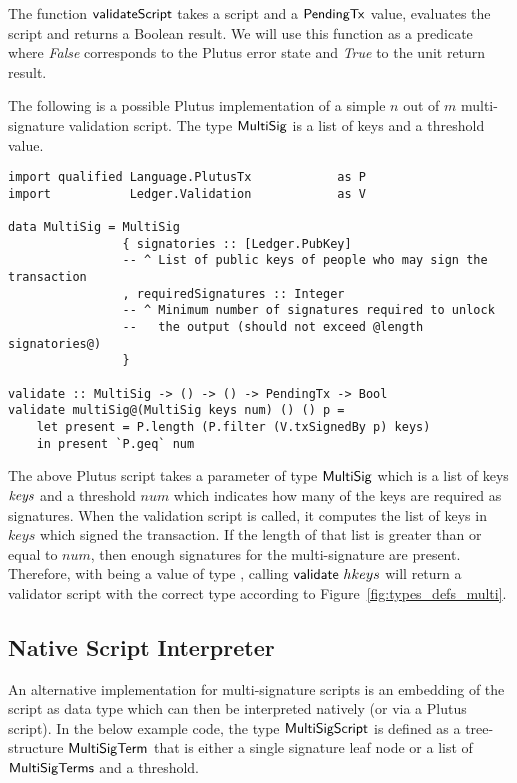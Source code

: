 \documentclass[11pt,a4paper,dvipsnames]{article}
\newcommand{\PendingTx}{\type{PendingTx}}
\theoremstyle{definition}
\begin{document}
The function $\mathsf{validateScript}$ takes a script and a $\PendingTx$ value,
evaluates the script and returns a Boolean result. We will use this function as
a predicate where \emph{False} corresponds to the Plutus error state and
\emph{True} to the unit return result.

The following is a possible Plutus implementation of a simple $n$ out of $m$
multi-signature validation script. The type $\mathsf{MultiSig}$ is a list of keys
and a threshold value.

\begin{verbatim}
import qualified Language.PlutusTx            as P
import           Ledger.Validation            as V

data MultiSig = MultiSig
                { signatories :: [Ledger.PubKey]
                -- ^ List of public keys of people who may sign the transaction
                , requiredSignatures :: Integer
                -- ^ Minimum number of signatures required to unlock
                --   the output (should not exceed @length signatories@)
                }

validate :: MultiSig -> () -> () -> PendingTx -> Bool
validate multiSig@(MultiSig keys num) () () p =
    let present = P.length (P.filter (V.txSignedBy p) keys)
    in present `P.geq` num
\end{verbatim}

The above Plutus script takes a parameter  of type
$\mathsf{MultiSig}$ which is a list of keys $\mathit{keys}$ and a threshold $num$
which indicates how many of the keys are required as signatures. When the
validation script is called, it computes the list of keys in $keys$ which signed
the transaction. If the length of that list is greater than or equal to $num$,
then enough signatures for the multi-signature are present. Therefore, with
 being a value of type , calling
$\mathsf{validate}~hkeys$ will return a validator script with the correct type
according to Figure~\ref{fig:types_defs_multi}.

\subsection{Native Script Interpreter}
\label{sec:native-script-interp}

An alternative implementation for multi-signature scripts is an embedding of the
script as data type which can then be interpreted natively (or via a Plutus
script). In the below example code, the type $\mathsf{MultiSigScript}$ is defined
as a tree-structure $\mathsf{MultiSigTerm}$ that is either a single signature leaf
node or a list of $\mathsf{MultiSigTerms}$ and a threshold.
\end{document}
